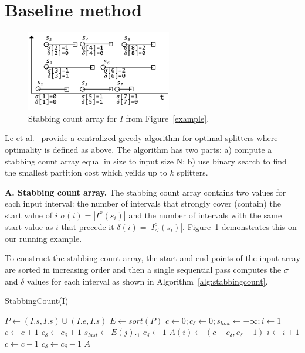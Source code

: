 \section{Baseline method}
\label{sec:baseline}

\begin{figure}
\centering
\includegraphics[width=2.5in]{figs/stabarray.pdf}
\caption{Stabbing count array for $I$ from Figure~\ref{example}.}
\label{fig:stabarray}
\end{figure}

Le et al.~\cite{Le2013} provide a centralized greedy algorithm for
optimal splitters where optimality is defined as above.  The algorithm
has two parts: a) compute a stabbing count array equal in size to
input size N; b) use binary search to find the smallest partition cost
which yeilds up to $k$ splitters.

{\bf A. Stabbing count array.}  The stabbing count array contains two
values for each input interval: the number of intervals that strongly
cover (contain) the start value of $i$ $\sigma(i) = |I^x(s_i)|$ and
the number of intervals with the same start value as $i$ that precede
it $\delta(i) = |I^o_<(s_i)|$.  Figure~\ref{fig:stabarray}
demonstrates this on our running example.

To construct the stabbing count array, the start and end points of the
input array are sorted in increasing order and then a single
sequential pass computes the $\sigma$ and $\delta$ values for each
interval as shown in Algorithm~\ref{alg:stabbingcount}.

\begin{algorithm}
\caption{StabbingCount(I)}
\begin{algorithmic}[1]
\State $P \gets (I.s,I.s) \cup (I.e,I.s) $
\State $E \gets sort(P)$
\State $c \gets 0; c_\delta \gets 0; s_{last} \gets -\infty; i \gets 1$
\State $c \gets c + 1$
\State $c_{\delta} \gets c_{\delta} + 1$
\Else
\State $s_{last} \gets E(j)._1$
\State $c_{\delta} \gets 1$
\EndIf
\State $A(i) \gets (c - c_{\delta}, c_{\delta} - 1)$
\State $i \gets i + 1$
\Else {} %
\State $c \gets c - 1$
\State $c_{\delta} \gets c_{\delta} - 1$
\EndIf
\EndIf
\EndFor
\Return $A$
\end{algorithmic}
\label{alg:stabbingcount}
\end{algorithm}

